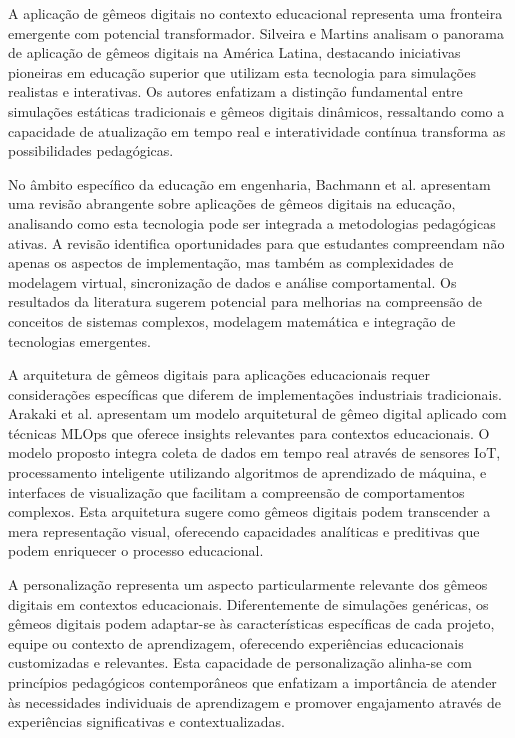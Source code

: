 \documentclass[12pt,a4paper]{article}
\renewcommand{\cite}[1]{}
\begin{document}
A aplicação de gêmeos digitais no contexto educacional representa uma fronteira
emergente com potencial transformador. Silveira e Martins
\cite{silveira2024panorama} analisam o panorama de aplicação de gêmeos digitais
na América Latina, destacando iniciativas pioneiras em educação superior que
utilizam esta tecnologia para simulações realistas e interativas. Os autores
enfatizam a distinção fundamental entre simulações estáticas tradicionais e
gêmeos digitais dinâmicos, ressaltando como a capacidade de atualização em
tempo real e interatividade contínua transforma as possibilidades pedagógicas.

No âmbito específico da educação em engenharia, Bachmann et al.
\cite{bachmann2023} apresentam uma revisão abrangente sobre aplicações de
gêmeos digitais na educação, analisando como esta tecnologia pode ser integrada
a metodologias pedagógicas ativas. A revisão identifica oportunidades para que
estudantes compreendam não apenas os aspectos de implementação, mas também as
complexidades de modelagem virtual, sincronização de dados e análise
comportamental. Os resultados da literatura sugerem potencial para melhorias na
compreensão de conceitos de sistemas complexos, modelagem matemática e
integração de tecnologias emergentes.

A arquitetura de gêmeos digitais para aplicações educacionais requer
considerações específicas que diferem de implementações industriais
tradicionais. Arakaki et al. \cite{arakaki2022} apresentam um modelo
arquitetural de gêmeo digital aplicado com técnicas MLOps que oferece insights
relevantes para contextos educacionais. O modelo proposto integra coleta de
dados em tempo real através de sensores IoT, processamento inteligente
utilizando algoritmos de aprendizado de máquina, e interfaces de visualização
que facilitam a compreensão de comportamentos complexos. Esta arquitetura
sugere como gêmeos digitais podem transcender a mera representação visual,
oferecendo capacidades analíticas e preditivas que podem enriquecer o processo
educacional.

A personalização representa um aspecto particularmente relevante dos gêmeos
digitais em contextos educacionais. Diferentemente de simulações genéricas, os
gêmeos digitais podem adaptar-se às características específicas de cada
projeto, equipe ou contexto de aprendizagem, oferecendo experiências
educacionais customizadas e relevantes. Esta capacidade de personalização
alinha-se com princípios pedagógicos contemporâneos que enfatizam a importância
de atender às necessidades individuais de aprendizagem e promover engajamento
através de experiências significativas e contextualizadas.
\end{document}
